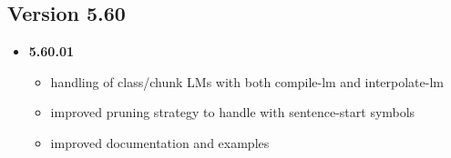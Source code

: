 \documentclass[11pt]{article}
\newcommand{\COMMENT}[1]{}
\begin{document}
\subsection{Version 5.60}
\begin{itemize}
\item {\bf 5.60.01}
\begin{itemize}
\item handling of class/chunk LMs with both compile-lm and interpolate-lm
\item improved pruning strategy to handle with sentence-start symbols
\item improved documentation and examples
\end{itemize}

\end{itemize}


\COMMENT{
\subsection{Version 5.xx}
\begin{itemize}
\item {\bf 5.xx.01}
\begin{itemize}
\item 
\end{itemize}
\end{itemize}
}
\end{document}
